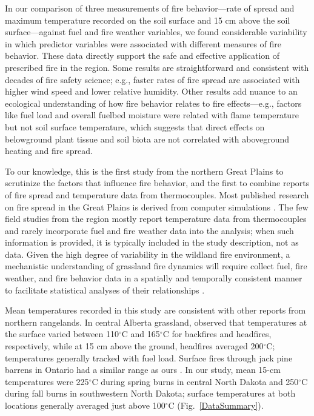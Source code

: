 \documentclass[referee, 
		     sn-basic]{sn-jnl}
\begin{document}
\begin{linenumbers}
In our comparison of three measurements of fire behavior---rate of spread and maximum temperature recorded on the soil surface and 15 cm
above the soil surface---against fuel and fire weather variables, we
found considerable variability in which predictor variables were
associated with different measures of fire behavior. These data directly
support the safe and effective application of prescribed fire in the
region. Some results are straightforward and consistent with decades of
fire safety science; e.g., faster rates of fire spread are associated
with higher wind speed and lower relative humidity. Other results add
nuance to an ecological understanding of how fire behavior relates to
fire effects---e.g., factors like fuel load and overall fuelbed moisture
were related with flame temperature but not soil surface temperature,
which suggests that direct effects on belowground plant tissue and soil
biota are not correlated with aboveground heating and fire spread.

To our knowledge, this is the first study from the northern Great Plains
to scrutinize the factors that influence fire behavior, and the first to
combine reports of fire spread and temperature data from thermocouples.
Most published research on fire spread in the Great Plains is derived
from computer simulations
\citep{mcgranahan2013, overholt2014, yurkonis2019}. The few field
studies from the region mostly report temperature data from
thermocouples and rarely incorporate fuel and fire weather data into the
analysis; when such information is provided, it is typically included in
the study description, not as data. Given the high degree of variability
in the wildland fire environment, a mechanistic understanding of
grassland fire dynamics will require collect fuel, fire weather, and
fire behavior data in a spatially and temporally consistent manner to
facilitate statistical analyses of their relationships
\citep{hiers2020, mcgranahan2018}.

Mean temperatures recorded in this study are consistent with other
reports from northern rangelands. In central Alberta grassland,
\citet{bailey1980} observed that temperatures at the surface varied between
110\(^\circ\)C and 165\(^\circ\)C for backfires and headfires,
respectively, while at 15 cm above the ground, headfires averaged 200\(^\circ\)C; temperatures generally tracked with fuel load. 
Surface fires through jack pine barrens in Ontario had a similar range as ours
\citep[140-545\(^\circ\)C,][]{smith1966}. In our study, mean 15-cm
temperatures were 225\(^\circ\)C during spring burns in central North
Dakota and 250\(^\circ\)C during fall burns in southwestern North
Dakota; surface temperatures at both locations generally averaged just
above 100\(^\circ\)C (Fig.~\ref{DataSummary}).


\end{linenumbers}
\end{document}
